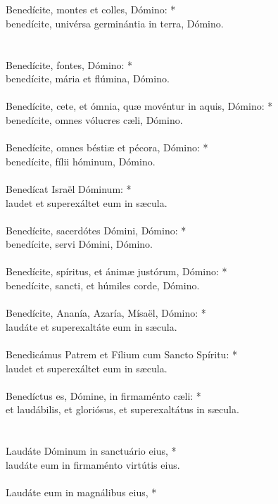 \documentclass[12pt, a4paper]{article}
\begin{document}
	\\\\
	Benedícite, montes et colles, Dómino: *\\
	benedícite, univérsa germinántia in terra, Dómino.
	\\\\
	\\
	Benedícite, fontes, Dómino: *\\
	benedícite, mária et flúmina, Dómino.
	\\\\
	Benedícite, cete, et ómnia, quæ movéntur in aquis, Dómino: *\\
	benedícite, omnes vólucres cæli, Dómino.
	\\\\
	Benedícite, omnes béstiæ et pécora, Dómino: *\\
	benedícite, fílii hóminum, Dómino.
	\\\\
	Benedícat Israël Dóminum: *\\
	laudet et superexáltet eum in sæcula.
	\\\\
	Benedícite, sacerdótes Dómini, Dómino: *\\
	benedícite, servi Dómini, Dómino.
	\\\\
	Benedícite, spíritus, et ánimæ justórum, Dómino: *\\
	benedícite, sancti, et húmiles corde, Dómino.
	\\\\
	Benedícite, Ananía, Azaría, Mísaël, Dómino: *\\
	laudáte et superexaltáte eum in sæcula.
	\\\\
	Benedicámus Patrem et Fílium cum Sancto Spíritu: *\\
	laudet et superexáltet eum in sæcula.
	\\\\
	Benedíctus es, Dómine, in firmaménto cæli: *\\
	et laudábilis, et gloriósus, et superexaltátus in sæcula.
	\\\\
	\\
	Laudáte Dóminum in sanctuário
	eius, *\\
	laudáte eum in firmaménto
	virtútis eius.
	\\\\
	Laudáte eum in magnálibus eius, *\\
\end{document}
